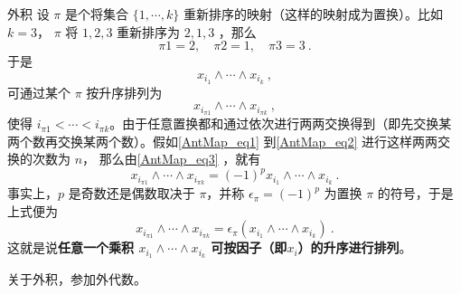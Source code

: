 \begin{example}{外积}
设 $\pi$ 是个将集合 $\{1,\cdots,k\}$ 重新排序的映射（这样的映射成为置换）。比如$k=3$， $\pi$ 将 $1,2,3$ 重新排序为 $2,1,3$ ，那么
\begin{equation}
\pi 1=2,\quad\pi2=1,\quad \pi3=3~.
\end{equation}
于是
\begin{equation}\label{AntMap_eq1}
x_{i_1}\wedge\cdots\wedge x_{i_k}~,
\end{equation}
可通过某个 $\pi$ 按升序排列为
\begin{equation}\label{AntMap_eq2}
x_{i_{\pi1}}\wedge\cdots\wedge x_{i_{\pi k}}~,
\end{equation}
使得 $i_{\pi1}<\cdots< i_{\pi k}$。由于任意置换都和通过依次进行两两交换得到（即先交换某两个数再交换某两个数）。假如\autoref{AntMap_eq1} 到\autoref{AntMap_eq2} 进行这样两两交换的次数为 $n$，
那么由\autoref{AntMap_eq3} ，就有
\begin{equation}
x_{i_{\pi1}}\wedge\cdots\wedge x_{i_{\pi k}}=(-1)^p x_{i_1}\wedge\cdots\wedge x_{i_k}~.
\end{equation}
事实上，$p$ 是奇数还是偶数取决于 $\pi$，并称 $\epsilon_\pi=(-1)^p$ 为置换 $\pi$ 的符号，于是上式便为
\begin{equation}
x_{i_{\pi1}}\wedge\cdots\wedge x_{i_{\pi k}}=\epsilon_\pi (x_{i_1}\wedge\cdots\wedge x_{i_k})~.
\end{equation}
这就是说\textbf{任意一个乘积 $x_{i_1}\wedge\cdots\wedge x_{i_k}$ 可按因子（即$x_i$）的升序进行排列}。

关于外积，参加外代数。
\end{example}
